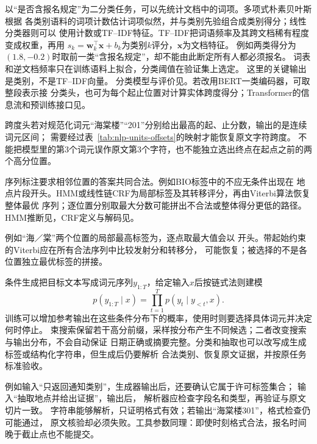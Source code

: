 以“是否含报名规定”为二分类任务，可以先统计文档中的词项。多项式朴素贝叶斯根据
各类别语料的词项计数估计词项似然，并与类别先验组合成类别得分；线性分类器则可以
使用计数或TF--IDF特征。TF--IDF把词语频率及其跨文档稀有程度变成权重，再用
$s_k=\bm{w}_k^\top\bm{x}+b_k$为类别$k$评分，$\bm{x}$为文档特征。
例如两类得分为$(1.8,-0.2)$时取前一类“含报名规定”，却不能由此断定所有人都必须报名。
词表和逆文档频率只在训练语料上拟合，分类阈值在验证集上选定。
这里的关键输出是类别，不是TF--IDF向量。
分类模型与评价见。若改用BERT一类编码器，可取整段表示接
分类头，也可为每个起止位置对计算实体跨度得分；Transformer的信息流和预训练接口见。

跨度头若对规范化词元“海棠楼”“201”分别给出最高的起、止分数，输出的是连续词元区间；
需要经过表~\ref{tab:nlp-units-offsets}的映射才能恢复原文字符跨度。
不能把模型里的第3个词元误作原文第3个字符，也不能独立选出终点在起点之前的两个高分位置。

序列标注要求相邻位置的答案共同合法。例如BIO标签中的不应无条件出现在
地点片段开头。HMM或线性链CRF为局部标签及其转移评分，再由Viterbi算法恢复整体最优
序列；逐位置分别取最大分数可能拼出不合法或整体得分更低的路径。HMM推断见，CRF定义与解码见。

例如“海／棠”两个位置的局部最高标签为，逐点取最大值会以
开头。带起始约束的Viterbi应在所有合法序列中比较发射分和转移分，
可能恢复；被选择的不是各位置独立最优标签的拼接。

条件生成把目标文本写成词元序列$y_{1:T}$，给定输入$x$后按链式法则建模
\begin{equation}
  p(y_{1:T}\mid x)
  =
  \prod_{t=1}^{T}p(y_t\mid y_{<t},x).
  \label{eq:nlp-conditional-generation}
\end{equation}
训练可以增加参考输出在这些条件分布下的概率，使用时则要选择具体词元并决定何时停止。
束搜索保留若干高分前缀，采样按分布产生不同候选；二者改变搜索与输出分布，不会自动保证
日期正确或摘要完整。分类和抽取也可以改写成生成标签或结构化字符串，但生成后仍要解析
合法类别、恢复原文证据，并按原任务标准验收。

例如输入“只返回通知类别”，生成器输出后，还要确认它属于许可标签集合；
输入“抽取地点并给出证据”，输出\code{venue=海棠楼201; span=[39,45)}后，
解析器应检查字段名和类型，再验证与原文切片一致。
字符串能够解析，只证明格式有效；若输出“海棠楼301”，格式检查仍可能通过，
原文核验却必须失败。工具参数同理：即使时刻格式合法，报名时间晚于截止点也不能提交。

